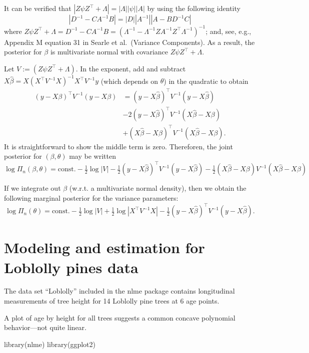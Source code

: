 \documentclass[
]{book}
\newenvironment{Shaded}{\begin{snugshade}}{\end{snugshade}}
\newcommand{\FunctionTok}[1]{\textcolor[rgb]{0.00,0.00,0.00}{#1}}
\newcommand{\NormalTok}[1]{#1}
\begin{document}
It can be verified that \(|Z\psi Z^\top +\Lambda| = |\Lambda||\psi||A|\) by using the following identity
\[|D^{-1} - CA^{-1}B| = |D||A^{-1}||A - BD^{-1}C|\]
where \(Z\psi Z^\top +\Lambda = D^{-1} - CA^{-1}B = (\Lambda^{-1} - \Lambda^{-1}ZA^{-1}Z^\top \Lambda^{-1})^{-1}\); and, see, e.g., Appendix M equation 31 in Searle et al.~(Variance Components). As a result, the posterior for \(\beta\) is multivariate normal with covariance \(Z\psi Z^\top +\Lambda\).

Let \(V := (Z\psi Z^\top +\Lambda)\). In the exponent, add and subtract \(X\hat\beta = X(X^\top V^{-1} X)^{-1}X^\top V^{-1}y\) (which depends on \(\theta\)) in the quadratic to obtain
\begin{align*}
\left(y - X\beta\right)^\top V^{-1}(y - X\beta) & = \left(y - X\hat\beta\right)^\top V^{-1}(y - X\hat\beta)\\
& -2 \left(y - X\hat\beta\right)^\top V^{-1}(X\hat\beta - X\beta)\\
& + \left(X\hat\beta - X\beta\right)^\top V^{-1}(X\hat\beta - X\beta).
\end{align*}
It is straightforward to show the middle term is zero. Thereforen, the joint posterior for \((\beta, \theta)\) may be written
\[\log \Pi_n(\beta, \theta) = \text{const}. -\tfrac12\log|V|-\tfrac12(y-X\hat\beta)^\top V^{-1}(y-X\hat\beta) -\tfrac12(X\hat\beta - X\beta)V^{-1}(X\hat\beta - X\beta)\]

If we integrate out \(\beta\) (w.r.t. a multivariate normal density), then we obtain the following marginal posterior for the variance parameters:
\[\log\Pi_n(\theta) = \text{const.} - \tfrac{1}{2}\log|V| + \tfrac{1}{2}\log|X^\top V^{-1}X|-\tfrac12 \left(y - X\hat\beta\right)^\top V^{-1}(y - X\hat\beta).\]

\hypertarget{modeling-and-estimation-for-loblolly-pines-data}{%
\section{Modeling and estimation for Loblolly pines data}\label{modeling-and-estimation-for-loblolly-pines-data}}

The data set ``Loblolly'' included in the nlme package contains longitudinal measurements of tree height for 14 Loblolly pine trees at 6 age points.

A plot of age by height for all trees suggests a common concave polynomial behavior---not quite linear.

\begin{Shaded}
\begin{Highlighting}[]
\FunctionTok{library}\NormalTok{(nlme)}
\FunctionTok{library}\NormalTok{(ggplot2)}
\end{Highlighting}
\end{Shaded}
\end{document}
